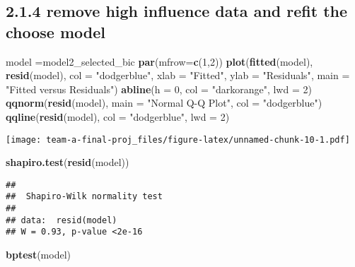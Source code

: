 \documentclass[]{article}
\newenvironment{Shaded}{\begin{snugshade}}{\end{snugshade}}
\newcommand{\DataTypeTok}[1]{\textcolor[rgb]{0.13,0.29,0.53}{#1}}
\newcommand{\DecValTok}[1]{\textcolor[rgb]{0.00,0.00,0.81}{#1}}
\newcommand{\KeywordTok}[1]{\textcolor[rgb]{0.13,0.29,0.53}{\textbf{#1}}}
\newcommand{\NormalTok}[1]{#1}
\newcommand{\StringTok}[1]{\textcolor[rgb]{0.31,0.60,0.02}{#1}}
\begin{document}
\hypertarget{remove-high-influence-data-and-refit-the-choose-model}{%
\subsection{2.1.4 remove high influence data and refit the choose
model}\label{remove-high-influence-data-and-refit-the-choose-model}}

\begin{Shaded}
\begin{Highlighting}[]
\NormalTok{model =model2_selected_bic}
\KeywordTok{par}\NormalTok{(}\DataTypeTok{mfrow=}\KeywordTok{c}\NormalTok{(}\DecValTok{1}\NormalTok{,}\DecValTok{2}\NormalTok{))}
\KeywordTok{plot}\NormalTok{(}\KeywordTok{fitted}\NormalTok{(model), }\KeywordTok{resid}\NormalTok{(model), }\DataTypeTok{col =} \StringTok{"dodgerblue"}\NormalTok{, }
     \DataTypeTok{xlab =} \StringTok{"Fitted"}\NormalTok{, }\DataTypeTok{ylab =} \StringTok{"Residuals"}\NormalTok{, }\DataTypeTok{main =} \StringTok{"Fitted versus Residuals"}\NormalTok{)}
\KeywordTok{abline}\NormalTok{(}\DataTypeTok{h =} \DecValTok{0}\NormalTok{, }\DataTypeTok{col =} \StringTok{"darkorange"}\NormalTok{, }\DataTypeTok{lwd =} \DecValTok{2}\NormalTok{)}
\KeywordTok{qqnorm}\NormalTok{(}\KeywordTok{resid}\NormalTok{(model), }\DataTypeTok{main =} \StringTok{"Normal Q-Q Plot"}\NormalTok{, }\DataTypeTok{col =} \StringTok{"dodgerblue"}\NormalTok{)}
\KeywordTok{qqline}\NormalTok{(}\KeywordTok{resid}\NormalTok{(model), }\DataTypeTok{col =} \StringTok{"dodgerblue"}\NormalTok{, }\DataTypeTok{lwd =} \DecValTok{2}\NormalTok{)}
\end{Highlighting}
\end{Shaded}

\texttt{[image: team-a-final-proj\_files/figure-latex/unnamed-chunk-10-1.pdf]}

\begin{Shaded}
\begin{Highlighting}[]
\KeywordTok{shapiro.test}\NormalTok{(}\KeywordTok{resid}\NormalTok{(model))}
\end{Highlighting}
\end{Shaded}

\begin{verbatim}
## 
##  Shapiro-Wilk normality test
## 
## data:  resid(model)
## W = 0.93, p-value <2e-16
\end{verbatim}

\begin{Shaded}
\begin{Highlighting}[]
\KeywordTok{bptest}\NormalTok{(model)}
\end{Highlighting}
\end{Shaded}
\end{document}
